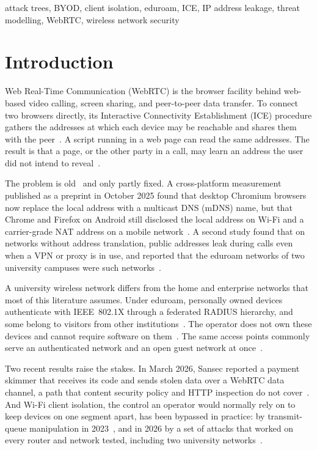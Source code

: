 \documentclass[conference]{IEEEtran}
\begin{document}
\begin{IEEEkeywords}
attack trees, BYOD, client isolation, eduroam, ICE, IP address leakage, threat modelling, WebRTC, wireless network security
\end{IEEEkeywords}

\section{Introduction}
Web Real-Time Communication (WebRTC) is the browser facility behind web-based video calling, screen sharing, and peer-to-peer data transfer. To connect two browsers directly, its Interactive Connectivity Establishment (ICE) procedure gathers the addresses at which each device may be reachable and shares them with the peer~\cite{rfc8445}. A script running in a web page can read the same addresses. The result is that a page, or the other party in a call, may learn an address the user did not intend to reveal~\cite{rfc8828,rfc8826}.

The problem is old~\cite{alfannah2017,fakis2020} and only partly fixed. A cross-platform measurement published as a preprint in October 2025 found that desktop Chromium browsers now replace the local address with a multicast DNS (mDNS) name, but that Chrome and Firefox on Android still disclosed the local address on Wi-Fi and a carrier-grade NAT address on a mobile network~\cite{koysha2025}. A second study found that on networks without address translation, public addresses leak during calls even when a VPN or proxy is in use, and reported that the eduroam networks of two university campuses were such networks~\cite{nibert2025}.

A university wireless network differs from the home and enterprise networks that most of this literature assumes. Under eduroam, personally owned devices authenticate with IEEE~802.1X through a federated RADIUS hierarchy, and some belong to visitors from other institutions~\cite{rfc7593}. The operator does not own these devices and cannot require software on them~\cite{cox2017}. The same access points commonly serve an authenticated network and an open guest network at once~\cite{airsnitch2026}.

Two recent results raise the stakes. In March 2026, Sansec reported a payment skimmer that receives its code and sends stolen data over a WebRTC data channel, a path that content security policy and HTTP inspection do not cover~\cite{sansec2026}. And Wi-Fi client isolation, the control an operator would normally rely on to keep devices on one segment apart, has been bypassed in practice: by transmit-queue manipulation in 2023~\cite{framingframes2023,macstealer}, and in 2026 by a set of attacks that worked on every router and network tested, including two university networks~\cite{airsnitch2026}.
\end{document}
